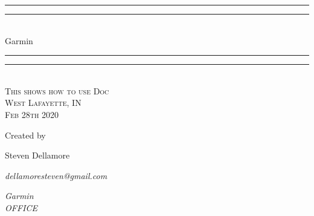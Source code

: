\documentclass[12pt]{report}
\newlength{\drop}
\begin{document}
  \begin{titlepage}
    \centering
    \textheight
    \vspace*{7\baselineskip}
    \rule{\textwidth}{1.6pt}\vspace*{-\baselineskip}\vspace*{2pt}
    \rule{\textwidth}{0.4pt}\\[\baselineskip]
    {\LARGE Garmin}\\[0.2\baselineskip]
    \rule{\textwidth}{0.4pt}\vspace*{-\baselineskip}\vspace{3.2pt}
    \rule{\textwidth}{1.6pt}\\[\baselineskip]
    \scshape
    This shows how to use Doc \\
    West Lafayette, IN \\
    Feb 28th 2020\par
    \vspace*{2\baselineskip}
    Created by \\[\baselineskip]
    {\Large Steven Dellamore\par}
    {\itshape dellamoresteven@gmail.com\par}
    {\itshape Garmin \\ OFFICE\par}
  \end{titlepage}
\end{document}
